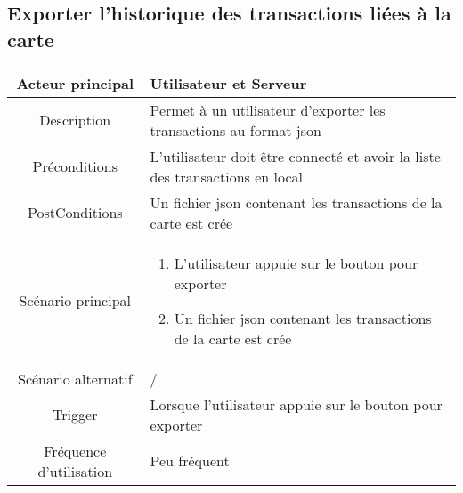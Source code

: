 \documentclass{article}
\begin{document}
\newpage

\subsection{Exporter l'historique des transactions liées à la carte}
    \begin{table}[h]
        \begin{tabular}{|c|p{10cm}|}
        \hline
        Acteur principal& Utilisateur et Serveur    \\
        \hline
        Description&  Permet à un utilisateur d'exporter les transactions au format json  \\
        \hline
        Préconditions& L'utilisateur doit être connecté et avoir la liste des transactions en local \\
        \hline
        PostConditions&  Un fichier json contenant les transactions de la carte est crée   \\
        \hline
        Scénario principal& 
                \begin{enumerate}
                    \item L'utilisateur appuie sur le bouton pour exporter
                    \item Un fichier json contenant les transactions de la carte est crée
                \end{enumerate}     \\
        \hline
        Scénario alternatif&  /    \\
        \hline
        Trigger&   Lorsque l'utilisateur appuie sur le bouton pour exporter  \\
        \hline
        Fréquence d'utilisation&    Peu fréquent  \\
        \hline
        \end{tabular}
    \end{table}

\newpage
\end{document}
